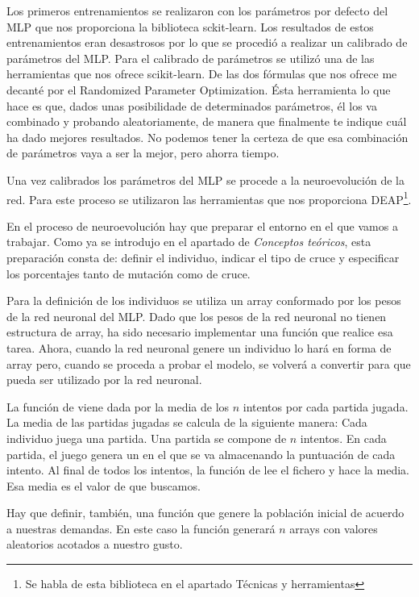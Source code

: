 Los primeros entrenamientos se realizaron con los parámetros por defecto del MLP que nos proporciona la biblioteca sckit-learn. Los resultados de estos entrenamientos eran desastrosos por lo que se procedió a realizar un calibrado de parámetros del MLP. Para el calibrado de parámetros se utilizó una de las herramientas que nos ofrece scikit-learn. De las dos fórmulas que nos ofrece me decanté por el Randomized Parameter Optimization. Ésta herramienta lo que hace es que, dados unas posibilidade de determinados parámetros, él los va combinado y probando aleatoriamente, de manera que finalmente te indique cuál ha dado mejores resultados. No podemos tener la certeza de que esa combinación de parámetros vaya a ser la mejor, pero ahorra tiempo.

Una vez calibrados los parámetros del MLP se procede a la neuroevolución de la red. Para este proceso se utilizaron las herramientas que nos proporciona DEAP\footnote{Se habla de esta biblioteca en el apartado Técnicas y herramientas}. 


En el proceso de neuroevolución hay que preparar el entorno en el que vamos a trabajar. Como ya se introdujo en el apartado de \emph{Conceptos teóricos}, esta preparación consta de: definir el individuo, indicar el tipo de cruce y especificar los porcentajes tanto de mutación como de cruce.

Para la definición de los individuos se utiliza un array conformado por los pesos de la red neuronal del MLP. Dado que los pesos de la red neuronal no tienen estructura de array, ha sido necesario implementar una función que realice esa tarea. Ahora, cuando la red neuronal genere un individuo lo hará en forma de array pero, cuando se proceda a probar el modelo, se volverá a convertir para que pueda ser utilizado por la red neuronal.

La función de  viene dada por la media de los $n$ intentos por cada partida jugada. La media de las partidas jugadas se calcula de la siguiente manera: Cada individuo juega una partida. Una partida se compone de $n$ intentos. En cada partida, el juego genera un  en el que se va almacenando la puntuación de cada intento. Al final de todos los intentos, la función de  lee el fichero y hace la media. Esa media es el valor de  que buscamos.


Hay que definir, también, una función que genere la población inicial de acuerdo a nuestras demandas. En este caso la función generará $n$ arrays con valores aleatorios acotados a nuestro gusto.


